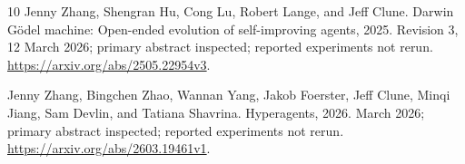 \documentclass[11pt,letterpaper]{article}
\begin{document}
\begin{thebibliography}{10}
Jenny Zhang, Shengran Hu, Cong Lu, Robert Lange, and Jeff Clune.
\newblock Darwin {G\"odel} machine: Open-ended evolution of self-improving
  agents, 2025.
\newblock Revision 3, 12 March 2026; primary abstract inspected; reported
  experiments not rerun. \url{https://arxiv.org/abs/2505.22954v3}.

Jenny Zhang, Bingchen Zhao, Wannan Yang, Jakob Foerster, Jeff Clune, Minqi
  Jiang, Sam Devlin, and Tatiana Shavrina.
\newblock Hyperagents, 2026.
 March 2026; primary abstract inspected; reported experiments not
  rerun. \url{https://arxiv.org/abs/2603.19461v1}.

\end{thebibliography}
\end{document}
